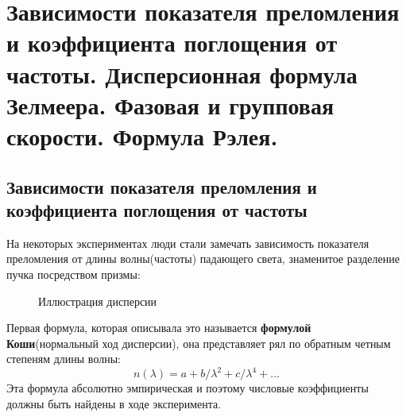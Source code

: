 \section{Зависимости показателя преломления и коэффициента поглощения от частоты. Дисперсионная формула Зелмеера. Фазовая и групповая скорости. Формула Рэлея.}
\subsection{Зависимости показателя преломления и коэффициента поглощения от частоты}
На некоторых экспериментах люди стали замечать зависимость показателя преломления от длины волны(частоты) падающего света, знаменитое разделение пучка посредством призмы:
\begin{figure}[h]\label{qr}
	\caption{Иллюстрация дисперсии}
	\label{fig:image}
\end{figure}


Первая формула, которая описывала это называется \textbf{формулой Коши}(нормальный ход дисперсии), она представляет рял по обратным четным степеням длины волны:
\begin{equation}
n(\lambda) = a + b/\lambda^2 + c/\lambda^4 + ...
\end{equation}
Эта формула абсолютно эмпирическая и поэтому числовые коэффициенты должны быть найдены в ходе эксперимента.

